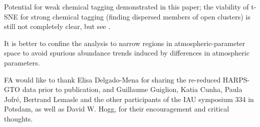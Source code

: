 \documentclass{aa}  %
\begin{document}
Potential for weak chemical tagging demonstrated in this paper; the viability of t-SNE for strong chemical tagging (finding dispersed members of open clusters) is still not completely clear, but see \citet{Kos2018}.

It is better to confine the analysis to narrow regions in atmospheric-parameter space to avoid spurious abundance trends induced by differences in atmospheric parameters. 







\begin{acknowledgements}
FA would like to thank Elisa Delgado-Mena for sharing the re-reduced HARPS-GTO data prior to publication, and Guillaume Guiglion, Katia Cunha, Paula Jofr\'e, Bertrand Lemasle and the other participants of the IAU symposium 334 in Potsdam, as well as David W. Hogg, for their encouragement and critical thoughts. 

\end{acknowledgements}

\end{document}

